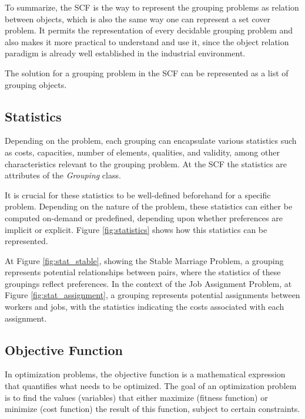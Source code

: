             

            To summarize, the SCF is the way to represent the grouping problems as relation between objects, which is also the same way one can represent a set cover problem. It permits the representation of every decidable grouping problem \cite{garey1979computers} and also makes it more practical to understand and use it, since the object relation paradigm is already well established in the industrial environment.

            The solution for a grouping problem in the SCF can be represented as a list of grouping objects.
                

        \subsection{Statistics}
            Depending on the problem, each grouping can encapsulate various statistics such as costs, capacities, number of elements, qualities, and validity, among other characteristics relevant to the grouping problem. At the SCF  the statistics are attributes of the \textit{Grouping} class.
            
            It is crucial for these statistics to be well-defined beforehand for a specific problem. Depending on the nature of the problem, these statistics can either be computed on-demand or predefined, depending upon whether preferences are implicit or explicit. Figure \ref{fig:statistics} shows how this statistics can be represented.

            
    
            At Figure \ref{fig:stat_stable}, showing the Stable Marriage Problem, a grouping represents potential relationships between pairs, where the statistics of these groupings reflect preferences. In the context of the Job Assignment Problem, at Figure \ref{fig:stat_assignment}, a grouping represents potential assignments between workers and jobs, with the statistics indicating the costs associated with each assignment.

        \subsection{Objective Function} \label{sec:obj_func}

            In optimization problems, the objective function is a mathematical expression that quantifies what needs to be optimized. The goal of an optimization problem is to find the values (variables) that either maximize (fitness function) or minimize (cost function) the result of this function, subject to certain constraints.
            
